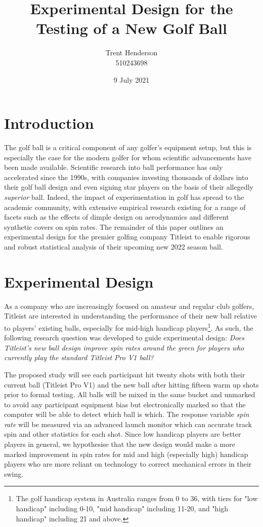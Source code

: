 \documentclass{article}
\begin{document}
\title{Experimental Design for the Testing of a New Golf Ball}
\author{Trent Henderson\\ 510243698}
\date{9 July 2021}

\maketitle

\section{Introduction}
The golf ball is a critical component of any golfer's equipment setup, but this is especially the case for the modern golfer for whom scientific advancements have been made available. 
Scientific research into ball performance has only accelerated since the 1990s, with companies investing thousands of dollars into their golf ball design and even signing star players on the basis of their allegedly \textit{superior} ball. 
Indeed, the impact of experimentation in golf has spread to the academic community, with extensive empirical research existing for a range of facets such as the effects of dimple design on aerodynamics and different synthetic covers on spin rates. 
The remainder of this paper outlines an experimental design for the premier golfing company Titleist to enable rigorous and robust statistical analysis of their upcoming new 2022 season ball.

\section{Experimental Design}
As a company who are increasingly focused on amateur and regular club golfers, Titleist are interested in understanding the performance of their new ball relative to players' existing balls, especially for mid-high handicap players\footnote{The golf handicap system in Australia ranges from 0 to 36, with tiers for "low handicap" including 0-10, "mid handicap" including 11-20, and "high handicap" including 21 and above.}. 
As such, the following research question was developed to guide experimental design: \textit{Does Titleist's new ball design improve spin rates around the green for players who currently play the standard Titleist Pro V1 ball?} 

The proposed study will see each participant hit twenty shots with both their current ball (Titleist Pro V1) and the new ball after hitting fifteen warm up shots prior to formal testing. 
All balls will be mixed in the same bucket and unmarked to avoid any participant equipment bias but electronically marked so that the computer will be able to detect which ball is which.
The response variable \textit{spin rate} will be measured via an advanced launch monitor which can accurate track spin and other statistics for each shot.
Since low handicap players are better players in general, we hypothesise that the new design would make a more marked improvement in spin rates for mid and high (especially high) handicap players who are more reliant on technology to correct mechanical errors in their swing.
\end{document}
